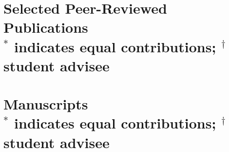\documentclass[margin,line]{res}
\begin{document}
\begin{resume}
\newpage
\section{{\sc Selected Peer-Reviewed Publications} \\[4pt]
{\small \normalfont $^*$ indicates equal contributions; $^\dagger$ student advisee}}
 
 \nocite{*}

\printbibliography[heading=none, keyword=peerjournal]

 

\section{{\sc Manuscripts} \\[4pt]
{\small \normalfont $^*$ indicates equal contributions; $^\dagger$ student advisee}}

 \printbibliography[heading=none, keyword=unpublished]






\end{resume}
\end{document}
